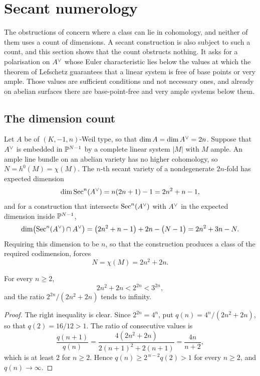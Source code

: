 \section{Secant numerology}\label{sec:numerology}

The obstructions of  concern where a class
can lie in cohomology, and neither of them uses a count of dimensions. A
secant construction is also subject to such a count, and this section shows
that the count obstructs nothing. It asks for a polarisation on $A^{\vee}$ whose
Euler characteristic lies below the values at which the theorem of Lefschetz
guarantees that a linear system is free of base points or very ample. Those
values are sufficient conditions and not necessary ones, and already on
abelian surfaces there are base-point-free and very ample systems below them.

\subsection{The dimension count}

\begin{setupenv}\label{setup:numerology}
Let $A$ be of $(K,-1,n)$-Weil type, so that $\dim A=\dim A^{\vee}=2n$. Suppose that
$A^{\vee}$ is embedded in $\mathbb{P}^{N-1}$ by a complete linear system $|M|$ with $M$
ample. An ample line bundle on an abelian variety has no higher cohomology,
so $N=h^{0}(M)=\chi(M)$. The $n$-th secant variety of a nondegenerate
$2n$-fold has expected dimension
\[
  \dim\operatorname{Sec}^{n}(A^{\vee})=n(2n+1)-1=2n^{2}+n-1,
\]
and for a construction that intersects $\operatorname{Sec}^{n}(A^{\vee})$ with $A^{\vee}$ in the
expected dimension inside $\mathbb{P}^{N-1}$,
\[
  \dim\bigl(\operatorname{Sec}^{n}(A^{\vee})\cap A^{\vee}\bigr)
  =\bigl(2n^{2}+n-1\bigr)+2n-\bigl(N-1\bigr)
  =2n^{2}+3n-N .
\]
Requiring this dimension to be $n$, so that the construction produces a class
of the required codimension, forces
\begin{equation}\label{eq:chirequired}
  N=\chi(M)=2n^{2}+2n .
\end{equation}
\end{setupenv}

\begin{lemma}\label{lem:chicompare}
For every $n\ge2$,
\[
  2n^{2}+2n<2^{2n}<3^{2n},
\]
and the ratio $2^{2n}/(2n^{2}+2n)$ tends to infinity.
\end{lemma}

\begin{proof}
The right inequality is clear. Since $2^{2n}=4^{n}$, put
$q(n)=4^{n}/(2n^{2}+2n)$, so that $q(2)=16/12>1$. The ratio of consecutive
values is
\[
  \frac{q(n+1)}{q(n)}=\frac{4(2n^{2}+2n)}{2(n+1)^{2}+2(n+1)}=\frac{4n}{n+2},
\]
which is at least $2$ for $n\ge2$. Hence $q(n)\ge2^{\,n-2}q(2)>1$ for every
$n\ge2$, and $q(n)\to\infty$.
\end{proof}

